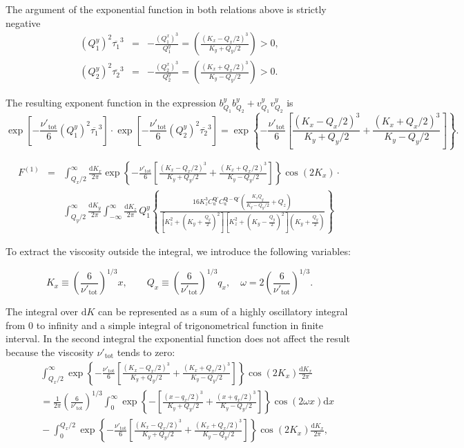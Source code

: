 \documentclass[prb,singlecolumn]{revtex4}
\begin{document}
The argument of the exponential function in both relations above is strictly negative
\begin{eqnarray*}
 (Q_1^y)^2\overline{\tau_1}^3 &=& -\frac{(Q_1^x)^3}{Q_1^y} = \left( \frac{(K_x-Q_x/2)^3}{K_y+Q_y/2}\right) > 0,\\
 (Q_2^y)^2\overline{\tau_2}^3 &=& -\frac{(Q_2^x)^3}{Q_2^y} = \left( \frac{(K_x+Q_x/2)^3}{K_y-Q_y/2}\right) > 0.
\end{eqnarray*}

The resulting exponent function in the expression $b^y_{Q_1}b^y_{Q_2} + v^y_{Q_1}v^y_{Q_2}$ is
\begin{equation*}
 \exp[-\frac{\nu'_{\mathrm{tot}}}{6}(Q_1^y)^2\overline{\tau_1}^3] \cdot \exp[-\frac{\nu'_{\mathrm{tot}}}{6}(Q_2^y)^2\overline{\tau_2}^3] =
 \exp\left\{ -\frac{\nu'_{\mathrm{tot}}}{6}\left[\frac{(K_x-Q_x/2)^3}{K_y+Q_y/2}+\frac{(K_x+Q_x/2)^3}{K_y-Q_y/2}\right]\right\}.
\end{equation*}
%

\begin{eqnarray}
  F^{(1)}&=&\int_{Q_x/2}^\infty \frac{\mathrm{d}K_x}{2\pi}  \exp\left\{ -\frac{\nu'_{\mathrm{tot}}}{6}\left[\frac{(K_x-Q_x/2)^3}{K_y+Q_y/2}+\frac{(K_x+Q_x/2)^3}{K_y-Q_y/2}\right]\right\} \cos(2K_x) \cdot \nonumber \\ 
  &&\int_{Q_y/2}^\infty \frac{\mathrm{d}K_y}{2\pi} \int_{-\infty}^\infty \frac{\mathrm{d}K_z}{2\pi} \, Q_1^y 
  \left\{ \frac{16K_z^3 C_\mathrm{u}^{\mathbf{Q}'}C_\mathrm{u}^{\mathbf{Q-Q}'}  \left( \frac{K_z Q_y}{K_y - Q_y/2} + Q_z\right) }
  { \left[K_z^2 + \left(K_y+\frac{Q_y}2 \right)^2\right] \left[K_z^2 + \left(K_y - \frac{Q_y}2 \right)^2\right]\left(K_y +\frac{Q_y}2 \right) }  \right\}
\end{eqnarray}


To extract the viscosity outside the integral, we introduce the following variables:


$$ K_x \equiv \left(\frac{6}{\nu'_\mathrm{tot}}\right)^{1/3} x, \qquad Q_x \equiv \left(\frac{6}{\nu'_\mathrm{tot}}\right)^{1/3} q_x,\quad \omega=2\left(\frac{6}{\nu'_\mathrm{tot}}\right)^{1/3}. $$

The integral over $\mathrm{d}K$ can be represented as a sum of a highly oscillatory integral from $0$ to infinity and a simple integral of trigonometrical function in finite interval.
In the second integral the exponential function does not affect the result because the viscosity $\nu'_\mathrm{tot}$ tends to zero:
%
\begin{eqnarray}
&& \int_{Q_x/2}^\infty \exp\left\{ -\frac{\nu'_{\mathrm{tot}}}{6}\left[\frac{(K_x-Q_x/2)^3}{K_y+Q_y/2}+\frac{(K_x+Q_x/2)^3}{K_y-Q_y/2}\right]\right\} \cos(2K_x) \frac{\mathrm{d}K_x}{2\pi} \\
&&{}= \frac1{2\pi}\left(\frac{6}{\nu'_\mathrm{tot}}\right)^{1/3}\int_{0}^\infty \exp\left\{-\left[\frac{(x-q_x/2)^3}{K_y+Q_y/2}+\frac{(x+q_x/2)^3}{K_y-Q_y/2}\right]\right\} \cos(2\omega x) \mathrm{d}x  \nonumber \\
&&{}- \int_0^{Q_x/2} \exp\left\{ -\frac{\nu'_{\mathrm{tot}}}{6}\left[\frac{(K_x-Q_x/2)^3}{K_y+Q_y/2}+\frac{(K_x+Q_x/2)^3}{K_y-Q_y/2}\right]\right\} \cos(2K_x) \frac{\mathrm{d}K_x}{2\pi},\nonumber
\end{eqnarray}
\end{document}

